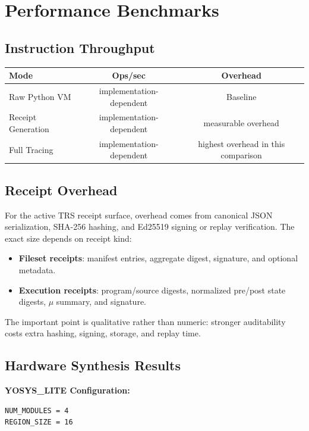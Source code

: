 \section{Performance Benchmarks}



\subsection{Instruction Throughput}

\begin{center}
\begin{tabular}{|l|c|c|}
\hline
\textbf{Mode} & \textbf{Ops/sec} & \textbf{Overhead} \\
\hline
Raw Python VM & implementation-dependent & Baseline \\
Receipt Generation & implementation-dependent & measurable overhead \\
Full Tracing & implementation-dependent & highest overhead in this comparison \\
\hline
\end{tabular}
\end{center}

\subsection{Receipt Overhead}

For the active TRS receipt surface, overhead comes from canonical JSON serialization, SHA-256 hashing, and Ed25519 signing or replay verification. The exact size depends on receipt kind:
\begin{itemize}
    \item \textbf{Fileset receipts}: manifest entries, aggregate digest, signature, and optional metadata.
    \item \textbf{Execution receipts}: program/source digests, normalized pre/post state digests, $\mu$ summary, and signature.
\end{itemize}

The important point is qualitative rather than numeric: stronger auditability costs extra hashing, signing, storage, and replay time.

\subsection{Hardware Synthesis Results}

\textbf{YOSYS\_LITE Configuration:}
\begin{lstlisting}
NUM_MODULES = 4
REGION_SIZE = 16
\end{lstlisting}

